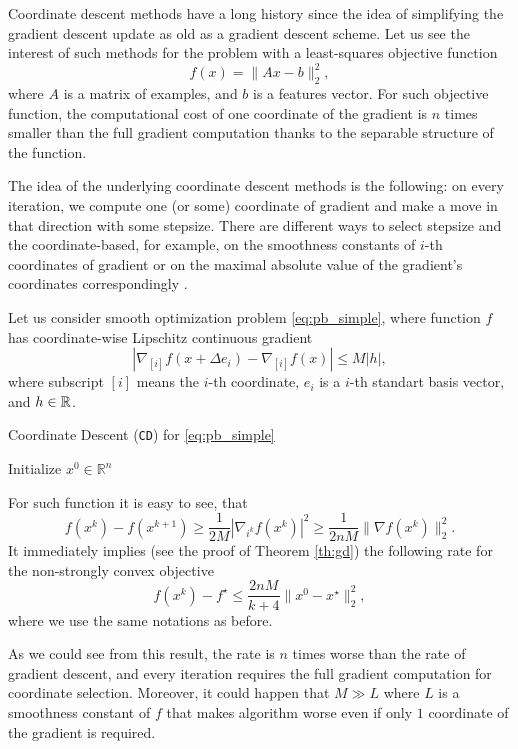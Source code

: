 Coordinate descent methods have a long history since the idea of simplifying the gradient descent update as old as a gradient descent scheme. Let us see the interest of such methods for the problem with a least-squares objective function
$$
f(x) = \|Ax-b\|_2^2,
$$
where $A$ is a matrix of examples, and $b$ is a features vector. For such objective function, the computational cost of one coordinate of the gradient is $n$ times smaller than the full gradient computation thanks to the separable structure of the function.

The idea of the underlying coordinate descent methods is the following: on every iteration, we compute one (or some) coordinate of gradient and make a move in that direction with some stepsize. There are different ways to select stepsize and the coordinate-based, for example, on the smoothness constants of $i$-th coordinates of gradient \cite{richtarik2012efficient} or on the maximal absolute value of the gradient's coordinates correspondingly \cite{nesterov2012efficiency}. 

Let us consider smooth optimization problem \eqref{eq:pb_simple}, where function $f$ has coordinate-wise Lipschitz continuous gradient
$$
|\nabla_{[i]} f(x+\Delta e_i) - \nabla_{[i]} f(x)|\leq M|h|,
$$
where subscript $[i]$ means the $i$-th coordinate, $e_i$ is a $i$-th standart basis vector, and $h\in\mathbb{R}$.
\begin{algorithm}
    \caption{Coordinate Descent (\texttt{CD}) for \eqref{eq:pb_simple}}
    \label{algo:cd}
    \begin{algorithmic}
        \STATE Initialize $x^0\in\mathbb{R}^n$
        \ENDFOR
    \end{algorithmic}
\end{algorithm}
For such function it is easy to see, that
$$
f(x^{k}) - f(x^{k+1})\geq \frac{1}{2M}|\nabla_{i^k} f(x^k)|^2\geq \frac{1}{2nM}\|\nabla f(x^k)\|_2^2.
$$
It immediately implies (see the proof of Theorem \ref{th:gd}) the following rate for the non-strongly convex objective
$$
f(x^k) - f^\star\leq \frac{2nM}{k+4}\|x^0-x^\star\|_2^2,
$$
where we use the same notations as before. 

As we could see from this result, the rate is $n$ times worse than the rate of gradient descent, and every iteration requires the full gradient computation for coordinate selection. Moreover, it could happen that $M\gg L$ where $L$ is a smoothness constant of $f$ that makes algorithm worse even if only $1$ coordinate of the gradient is required.

